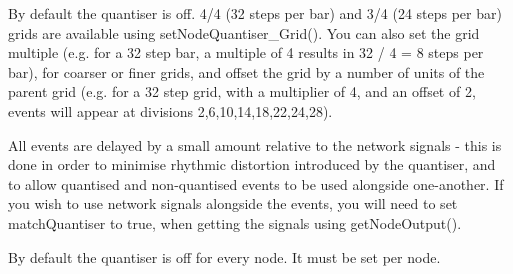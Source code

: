 By default the quantiser is off. 4/4 (32 steps per bar) and 3/4 (24 steps per bar) grids are available using set\+Node\+Quantiser\+\_\+\+Grid(). You can also set the grid multiple (e.\+g. for a 32 step bar, a multiple of 4 results in 32 / 4 = 8 steps per bar), for coarser or finer grids, and offset the grid by a number of units of the parent grid (e.\+g. for a 32 step grid, with a multiplier of 4, and an offset of 2, events will appear at divisions 2,6,10,14,18,22,24,28).

All events are delayed by a small amount relative to the network signals -\/ this is done in order to minimise rhythmic distortion introduced by the quantiser, and to allow quantised and non-\/quantised events to be used alongside one-\/another. If you wish to use network signals alongside the events, you will need to set {\ttfamily match\+Quantiser} to true, when getting the signals using get\+Node\+Output().

By default the quantiser is off for every node. It must be set per node. 